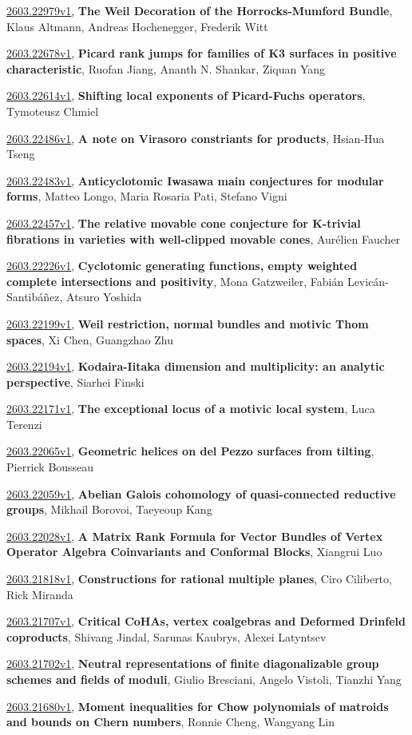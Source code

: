 \documentclass[9pt, a4paper]{article}
\theoremstyle{plain}
\theoremstyle{definition}
\theoremstyle{remark}
\newcommand{\arxiv}[3]{\href{https://arxiv.org/abs/#1}{#1}, \textbf{\textcolor{arxivblue}{#2}}, #3}
\begin{document}
\arxiv{2603.22979v1}{The Weil Decoration of the Horrocks-Mumford Bundle}{Klaus Altmann, Andreas Hochenegger, Frederik Witt}

\arxiv{2603.22678v1}{Picard rank jumps for families of K3 surfaces in positive characteristic}{Ruofan Jiang, Ananth N. Shankar, Ziquan Yang}

\arxiv{2603.22614v1}{Shifting local exponents of Picard-Fuchs operators}{Tymoteusz Chmiel}

\arxiv{2603.22486v1}{A note on Virasoro constriants for products}{Hsian-Hua Tseng}

\arxiv{2603.22483v1}{Anticyclotomic Iwasawa main conjectures for modular forms}{Matteo Longo, Maria Rosaria Pati, Stefano Vigni}

\arxiv{2603.22457v1}{The relative movable cone conjecture for K-trivial fibrations in varieties with well-clipped movable cones}{Aurélien Faucher}

\arxiv{2603.22226v1}{Cyclotomic generating functions, empty weighted complete intersections and positivity}{Mona Gatzweiler, Fabián Levicán-Santibáñez, Atsuro Yoshida}

\arxiv{2603.22199v1}{Weil restriction, normal bundles and motivic Thom spaces}{Xi Chen, Guangzhao Zhu}

\arxiv{2603.22194v1}{Kodaira-Iitaka dimension and multiplicity: an analytic perspective}{Siarhei Finski}

\arxiv{2603.22171v1}{The exceptional locus of a motivic local system}{Luca Terenzi}

\arxiv{2603.22065v1}{Geometric helices on del Pezzo surfaces from tilting}{Pierrick Bousseau}

\arxiv{2603.22059v1}{Abelian Galois cohomology of quasi-connected reductive groups}{Mikhail Borovoi, Taeyeoup Kang}

\arxiv{2603.22028v1}{A Matrix Rank Formula for Vector Bundles of Vertex Operator Algebra Coinvariants and Conformal Blocks}{Xiangrui Luo}

\arxiv{2603.21818v1}{Constructions for rational multiple planes}{Ciro Ciliberto, Rick Miranda}

\arxiv{2603.21707v1}{Critical CoHAs, vertex coalgebras and Deformed Drinfeld coproducts}{Shivang Jindal, Sarunas Kaubrys, Alexei Latyntsev}

\arxiv{2603.21702v1}{Neutral representations of finite diagonalizable group schemes and fields of moduli}{Giulio Bresciani, Angelo Vistoli, Tianzhi Yang}

\arxiv{2603.21680v1}{Moment inequalities for Chow polynomials of matroids and bounds on Chern numbers}{Ronnie Cheng, Wangyang Lin}
\end{document}

